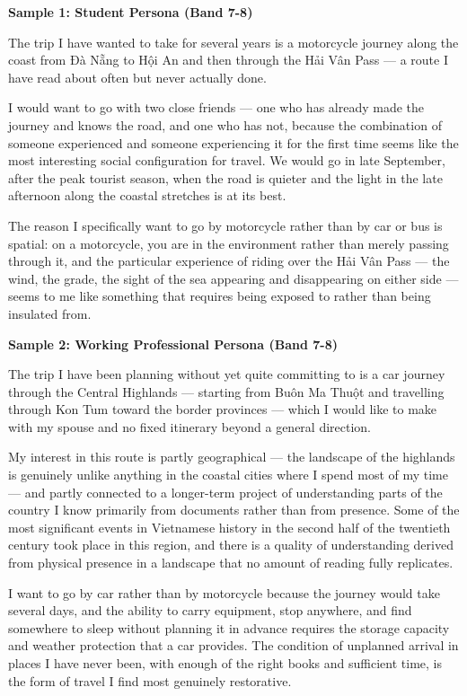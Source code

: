 \begin{ieltsanswer}
\textbf{Sample 1: Student Persona (Band 7-8)}

The trip I have wanted to take for several years is a motorcycle journey along the coast from Đà Nẵng to Hội An and then through the Hải Vân Pass — a route I have read about often but never actually done.

I would want to go with two close friends — one who has already made the journey and knows the road, and one who has not, because the combination of someone experienced and someone experiencing it for the first time seems like the most interesting social configuration for travel. We would go in late September, after the peak tourist season, when the road is quieter and the light in the late afternoon along the coastal stretches is at its best.

The reason I specifically want to go by motorcycle rather than by car or bus is spatial: on a motorcycle, you are in the environment rather than merely passing through it, and the particular experience of riding over the Hải Vân Pass — the wind, the grade, the sight of the sea appearing and disappearing on either side — seems to me like something that requires being exposed to rather than being insulated from.

\textbf{Sample 2: Working Professional Persona (Band 7-8)}

The trip I have been planning without yet quite committing to is a car journey through the Central Highlands — starting from Buôn Ma Thuột and travelling through Kon Tum toward the border provinces — which I would like to make with my spouse and no fixed itinerary beyond a general direction.

My interest in this route is partly geographical — the landscape of the highlands is genuinely unlike anything in the coastal cities where I spend most of my time — and partly connected to a longer-term project of understanding parts of the country I know primarily from documents rather than from presence. Some of the most significant events in Vietnamese history in the second half of the twentieth century took place in this region, and there is a quality of understanding derived from physical presence in a landscape that no amount of reading fully replicates.

I want to go by car rather than by motorcycle because the journey would take several days, and the ability to carry equipment, stop anywhere, and find somewhere to sleep without planning it in advance requires the storage capacity and weather protection that a car provides. The condition of unplanned arrival in places I have never been, with enough of the right books and sufficient time, is the form of travel I find most genuinely restorative.
\end{ieltsanswer}



